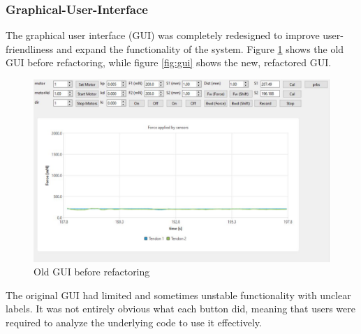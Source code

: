 \subsubsection{Graphical-User-Interface}
The graphical user interface (GUI) was completely redesigned to improve user-friendliness and expand the functionality of the system. Figure \ref{fig:oldgui} shows the old GUI before refactoring, while figure \ref{fig:gui} shows the new, refactored GUI.

\begin{figure}[H]
    \centering
    \includegraphics[width=0.95\linewidth]{images/gui/oldGUI.PNG}
    \caption{Old GUI before refactoring}
    \label{fig:oldgui}
\end{figure}
The original GUI had limited and sometimes unstable functionality with unclear labels. It was not entirely obvious what each button did, meaning that users were required to analyze the underlying code to use it effectively.

